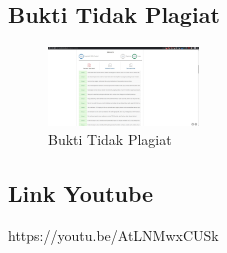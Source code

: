\subsection{Bukti Tidak Plagiat}
\begin{figure}[H]
	\includegraphics[width=4cm]{figures/1174066/5/plagiat.jpg}
	\centering
	\caption{Bukti Tidak Plagiat}
\end{figure}

\subsection{Link Youtube}
https://youtu.be/AtLNMwxCUSk
